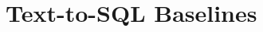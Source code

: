 \documentclass{article} %
\begin{document}
 \section{Text-to-SQL Baselines}\label{sec:app:text2sql:baselines}



    
    
    
    
\end{document}
